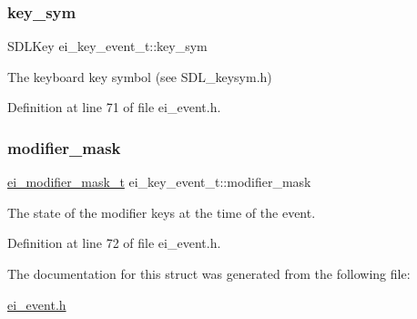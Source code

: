 \subsubsection{\texorpdfstring{key\+\_\+sym}{key\_sym}}
{\footnotesize\ttfamily S\+D\+L\+Key ei\+\_\+key\+\_\+event\+\_\+t\+::key\+\_\+sym}



The keyboard key symbol (see S\+D\+L\+\_\+keysym.\+h) 



Definition at line 71 of file ei\+\_\+event.\+h.

\mbox{\label{structei__key__event__t_a35e4dc6d788b9fdd4eeedf716662afab}} 
\subsubsection{\texorpdfstring{modifier\+\_\+mask}{modifier\_mask}}
{\footnotesize\ttfamily \hyperlink{ei__event_8h_abcdd2ef0f39179463f17a06be9bdf949}{ei\+\_\+modifier\+\_\+mask\+\_\+t} ei\+\_\+key\+\_\+event\+\_\+t\+::modifier\+\_\+mask}



The state of the modifier keys at the time of the event. 



Definition at line 72 of file ei\+\_\+event.\+h.



The documentation for this struct was generated from the following file\+:\begin{DoxyCompactItemize}
\item 
\hyperlink{ei__event_8h}{ei\+\_\+event.\+h}\end{DoxyCompactItemize}
